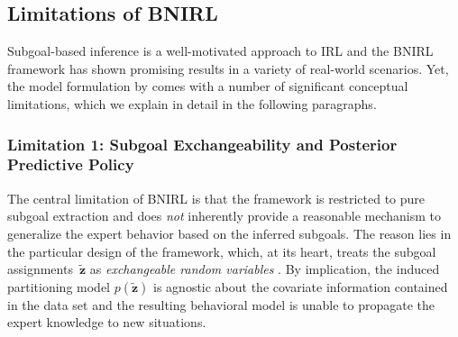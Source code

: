 \documentclass[twoside,11pt]{article}
\begin{document}
\subsection{Limitations of BNIRL}
\label{sec:limitations}
%
%
%
%
Subgoal-based inference is a well-motivated approach to IRL %
and the BNIRL framework has shown promising results in a variety of real-world scenarios. Yet, the model formulation by \cite{michini2012bayesian} comes with a number of significant conceptual %
limitations, which we explain in detail in the following paragraphs.



\subsubsection*{Limitation 1: Subgoal Exchangeability and Posterior Predictive Policy} 
\label{phantom:lim1}
The central limitation of BNIRL is that %
the framework is restricted to pure subgoal extraction and does \textit{not} inherently 
%
provide a reasonable %
%
%
mechanism to %
generalize the expert behavior based on %
the inferred subgoals. %
The reason lies in the particular design of the framework, which, at its heart, treats the subgoal assignments~$\mathbf{\tilde{z}}$ as \textit{exchangeable random variables} \citep{aldous1985exchangeability}. By implication, %
the %
induced partitioning model $p(\mathbf{\tilde{z}})$ is agnostic about the %
covariate information contained 
in the data set %
%
and the resulting behavioral model is unable to 
propagate the expert %
knowledge 
%
to new situations. %
\end{document}
